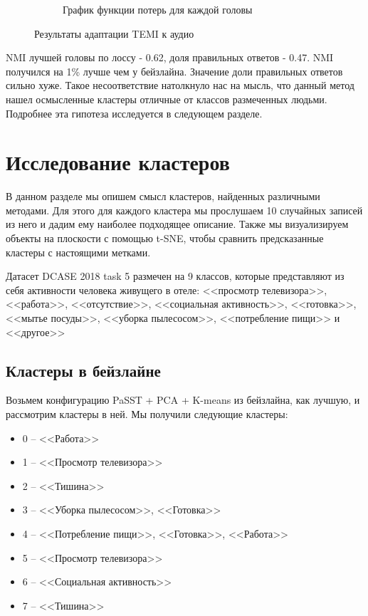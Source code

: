 \documentclass[a4paper,12pt]{extarticle}
\begin{document}
\begin{figure}[ht]
\begin{subfigure}{.5\textwidth}
        \caption{График функции потерь для каждой головы}
    \end{subfigure}
	\caption{Результаты адаптации TEMI к аудио}
	\label{fig:temi_a_graphs}
\end{figure}

\newpage

NMI лучшей головы по лоссу - 0.62, доля правильных 
ответов - 0.47. NMI получился на 1\% лучше чем 
у бейзлайна. Значение доли правильных ответов сильно
хуже. Такое несоответствие натолкнуло нас на мысль, что 
данный метод нашел осмысленные кластеры отличные от 
классов размеченных людьми. Подробнее эта гипотеза 
исследуется в следующем разделе.

\section{Исследование кластеров}

В данном разделе мы опишем смысл кластеров, найденных 
различными методами. Для этого для каждого кластера мы прослушаем 
10 случайных записей из него и дадим ему наиболее подходящее описание.
Также мы визуализируем объекты на плоскости с помощью t-SNE, чтобы 
сравнить предсказанные кластеры с настоящими метками.

Датасет DCASE 2018 task 5 размечен на 9 классов, которые 
представляют из себя активности человека живущего в отеле:
<<просмотр телевизора>>, <<работа>>, <<отсутствие>>, <<социальная 
активность>>, <<готовка>>, <<мытье посуды>>, <<уборка пылесосом>>,
<<потребление пищи>> и <<другое>>

\subsection{Кластеры в бейзлайне}

Возьмем конфигурацию PaSST + PCA + K-means из бейзлайна, как 
лучшую, и рассмотрим кластеры в ней. Мы получили следующие
кластеры:

\begin{itemize}
    \item 0 -- <<Работа>>
    \item 1 -- <<Просмотр телевизора>>
    \item 2 -- <<Тишина>>
    \item 3 -- <<Уборка пылесосом>>, <<Готовка>>
    \item 4 -- <<Потребление пищи>>, <<Готовка>>, <<Работа>>
    \item 5 -- <<Просмотр телевизора>>
    \item 6 -- <<Социальная активность>>
    \item 7 -- <<Тишина>>
\end{itemize}
\end{document}
